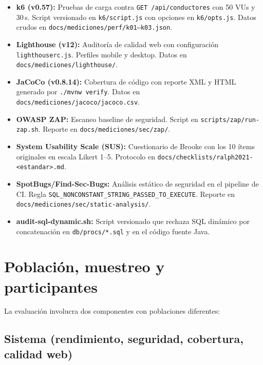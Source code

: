 \begin{itemize}
  \item \textbf{k6 (v0.57):} Pruebas de carga contra \texttt{GET /api/conductores} con 50 VUs y 30\,s. Script versionado en \texttt{k6/script.js} con opciones en \texttt{k6/opts.js}. Datos crudos en \texttt{docs/mediciones/perf/k01--k03.json}.

  \item \textbf{Lighthouse (v12):} Auditoría de calidad web con configuración \texttt{lighthouserc.js}. Perfiles mobile y desktop. Datos en \texttt{docs/mediciones/lighthouse/}.

  \item \textbf{JaCoCo (v0.8.14):} Cobertura de código con reporte XML y HTML generado por \texttt{./mvnw verify}. Datos en \texttt{docs/mediciones/jacoco/jacoco.csv}.

  \item \textbf{OWASP ZAP:} Escaneo baseline de seguridad. Script en \texttt{scripts/zap/run-zap.sh}. Reporte en \texttt{docs/mediciones/sec/zap/}.

  \item \textbf{System Usability Scale (SUS):} Cuestionario de Brooke \cite{brooke1996} con los 10 ítems originales en escala Likert 1--5. Protocolo en \texttt{docs/checklists/ralph2021-<estandar>.md}.

  \item \textbf{SpotBugs/Find-Sec-Bugs:} Análisis estático de seguridad en el pipeline de CI. Regla \texttt{SQL\_NONCONSTANT\_STRING\_PASSED\_TO\_EXECUTE}. Reporte en \texttt{docs/mediciones/sec/static-analysis/}.

  \item \textbf{audit-sql-dynamic.sh:} Script versionado que rechaza SQL dinámico por concatenación en \texttt{db/procs/*.sql} y en el código fuente Java.
\end{itemize}

\section{Población, muestreo y participantes}
\label{sec:muestreo}

La evaluación involucra dos componentes con poblaciones diferentes:

\subsection{Sistema (rendimiento, seguridad, cobertura, calidad web)}

